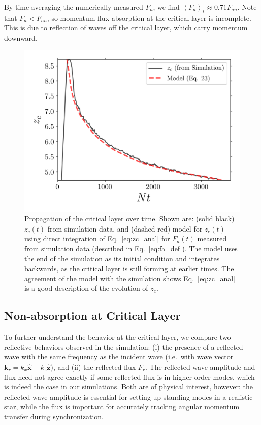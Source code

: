 \documentclass[
        fleqn,
        usenatbib,
    ]{mnras}
\newcommand*{\ev}[1]{\left\langle#1\right\rangle}
\newcommand*{\bm}[1]{\mathbf{#1}}
\newcommand*{\uv}[1]{\hat{\mathbf{#1}}}
\begin{document}
By time-averaging the numerically measured $F_a$, we find $\ev{F_a}_t \approx
0.71F_{an}$. Note that $F_a < F_{an}$, so momentum flux absorption at the
critical layer is incomplete. This is due to reflection of waves off the
critical layer, which carry momentum downward.
\begin{figure}
    \centering
    \includegraphics[width=0.9\columnwidth]{plots/nl_front.png}
    \caption{Propagation of the critical layer over time. Shown are: (solid black)
    $z_c(t)$ from simulation data, and (dashed red) model for $z_c(t)$ using direct
    integration of Eq.~\eqref{eq:zc_anal} for $F_a(t)$ measured from simulation
    data (described in Eq.~\eqref{eq:fa_def}). The model uses the end of the
    simulation as its initial condition and integrates backwards, as the
    critical layer is still forming at earlier times. The agreement of the model
    with the simulation shows Eq.~\eqref{eq:zc_anal} is a good description of
    the evolution of $z_c$.}\label{fig:nl_front}
\end{figure}

\subsection{Non-absorption at Critical Layer}\label{ss:reflectivity}

To further understand the behavior at the critical layer, we compare two
reflective behaviors observed in the simulation: (i) the presence of a reflected
wave with the same frequency as the incident wave (i.e.\ with wave vector
$\bm{k}_r = k_{x}\uv{x} - k_{z}\uv{z}$), and (ii) the reflected flux $F_r$. The
reflected wave amplitude and flux need not agree exactly if some reflected flux
is in higher-order modes, which is indeed the case in our simulations. Both are
of physical interest, however: the reflected wave amplitude is essential for
setting up standing modes in a realistic star, while the flux is important for
accurately tracking angular momentum transfer during synchronization.
\end{document}
